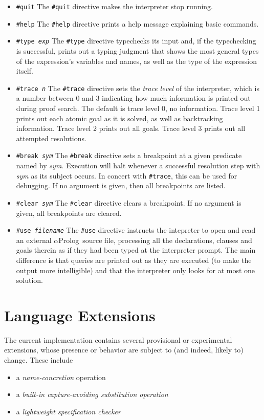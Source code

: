 \documentclass[draft,12pt]{report}
\newcommand{\aprolog}{$\alpha${Prolog}\xspace}
\begin{document}
\begin{itemize}
\item{\tt \#quit} The {\tt \#quit} directive makes the interpreter
  stop running.
\item{\tt \#help} The {\tt \#help} directive prints a help message
  explaining basic commands.
\item{ \tt \#type {\it exp}} The {\tt \#type} directive typechecks its
  input and, if the typechecking is successful, prints out a typing
  judgment that shows the most general types of the expression's
  variables and names, as well as the type of the expression itself.
\item{\tt \#trace {\it n}} The {\tt \#trace} directive sets the
  \emph{trace level} of the interpreter, which is a number between 0
  and 3 indicating how much information is printed out during proof
  search.  The default is trace level 0, no information.  Trace level
  1 prints out each atomic goal as it is solved, as well as
  backtracking information.  Trace level 2 prints out all goals.
  Trace level 3 prints out all attempted resolutions.
\item {\tt \#break {\it sym}} The {\tt \#break} directive sets a
  breakpoint at a given predicate named by {\it sym}.  Execution will
  halt whenever a successful resolution step with {\it sym} as its
  subject occurs.  In concert with {\tt \#trace}, this can be used for
  debugging.  If no argument is given, then all breakpoints are
  listed.
  
\item {\tt \#clear {\it sym}} The {\tt \#clear} directive clears a
  breakpoint.  If no argument is given, all breakpoints are cleared.
  
\item{\tt \#use {\it filename}} The {\tt \#use} directive instructs
  the intepreter to open and read an external \aprolog\ source file,
  processing all the declarations, clauses and goals therein as if
  they had been typed at the interpreter prompt.  The main difference
  is that queries are printed out as they are executed (to make the
  output more intelligible) and that the interpreter only looks for at
  most one solution.
\end{itemize}

\chapter{Language Extensions}

The current implementation contains several provisional or experimental 
extensions, whose presence or behavior are subject to (and indeed, likely to) change.  These include 
\begin{itemize}
\item a \emph{name-concretion} operation
\item a \emph{built-in capture-avoiding substitution operation}
\item a \emph{lightweight specification checker}
\end{itemize}
\end{document}

